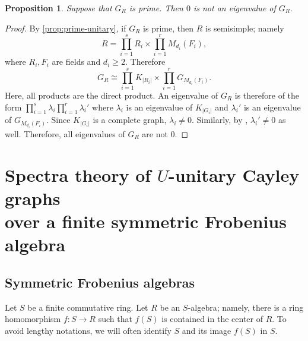\documentclass[12pt, a4paper]{amsart}
\newtheorem{prop}[thm]{Proposition}
\theoremstyle{definition}
\numberwithin{equation}{section}
\begin{document}
\begin{prop}
    Suppose that $G_{R}$ is prime. Then $0$ is not an eigenvalue of $G_R.$
\end{prop}
\begin{proof}
    By \cref{prop:prime-unitary}, if $G_R$ is prime, then $R$ is semisimple; namely 
    \[ R = \prod_{i=1}^s R_i \times \prod_{i=1}^r M_{d_i}(F_i), \]
    where $R_i, F_i$ are fields and $d_i \geq 2.$ Therefore 
    \[ G_{R} \cong \prod_{i=1}^s K_{|R_i|} \times \prod_{i=1}^r G_{M_{d_i}(F_i)}.\]
Here, all products are the direct product.    An eigenvalue of $G_{R}$ is therefore of the form $\prod_{i=1}^s \lambda_{i} \prod_{i=1}^r \lambda_{i}' $ where $\lambda_i$ is an eigenvalue of $K_{|G_i|}$ and $\lambda_i'$ is an eigenvalue of $G_{M_{d_i}(F_i)}.$ Since $K_{|G_i|}$ is a complete graph, $\lambda_i \neq 0.$ Similarly, by \cite[Theorem 1.1]{chen2022unitary}, $\lambda_i' \neq 0$ as well. Therefore, all eigenvalues of $G_{R}$ are not $0.$
\end{proof}

\section{Spectra theory of $U$-unitary Cayley graphs \\ over a finite symmetric Frobenius algebra} \label{sec:spectra}

\subsection{Symmetric Frobenius algebras}
Let $S$ be a finite commutative ring. Let $R$ be an $S$-algebra; namely, there is a ring homomorphism $f\colon S \to R$ such that $f(S)$ is contained in the center of $R.$ To avoid lengthy notations, we will often identify $S$ and its image $f(S)$ in $S.$ 
\end{document}
